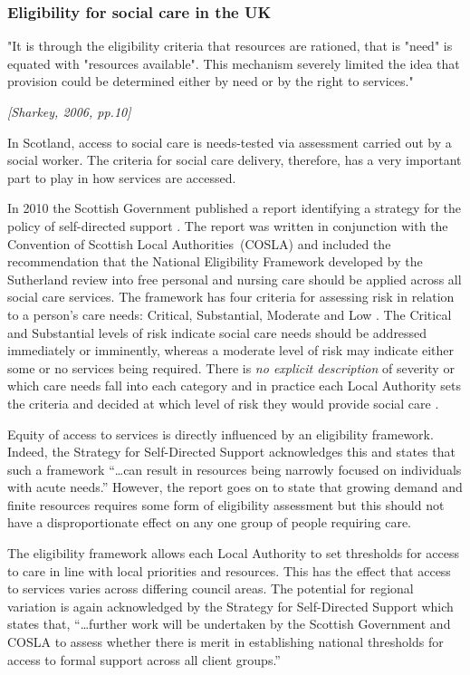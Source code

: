 \documentclass[12pt,]{report}
\begin{document}
\subsubsection{Eligibility for social care in the UK}\label{subsubsec:eligibility-uk}

\epigraph{"It is through the eligibility criteria that resources are rationed, that is "need" is equated with "resources available". This mechanism severely limited the idea that provision could be determined either by need or by the right to services."}{\textit{[Sharkey, 2006, pp.10]}}

In Scotland, access to social care is needs-tested via assessment
carried out by a social worker. The criteria for social care delivery,
therefore, has a very important part to play in how services are
accessed.

In 2010 the Scottish Government published a report identifying a
strategy for the policy of self-directed support \citep{RN171}. The
report was written in conjunction with the Convention of Scottish Local
Authorities~(COSLA) and included the recommendation that the National
Eligibility Framework developed by the Sutherland review into free
personal and nursing care \citeyearpar{RN172} should be applied across
all social care services. The framework has four criteria for assessing
risk in relation to a person's care needs: Critical, Substantial,
Moderate and Low \citep{RN184}. The Critical and Substantial levels of
risk indicate social care needs should be addressed immediately or
imminently, whereas a moderate level of risk may indicate either some or
no services being required. There is \emph{no explicit description} of
severity or which care needs fall into each category and in practice
each Local Authority sets the criteria and decided at which level of
risk they would provide social care \citep{RN170}.

Equity of access to services is directly influenced by an eligibility
framework. Indeed, the Strategy for Self-Directed Support
\citep[pp.20]{RN171} acknowledges this and states that such a framework
``\ldots{}can result in resources being narrowly focused on individuals
with acute needs.'' However, the report goes on to state that growing
demand and finite resources requires some form of eligibility assessment
but this should not have a disproportionate effect on any one group of
people requiring care.

The eligibility framework allows each Local Authority to set thresholds
for access to care in line with local priorities and resources. This has
the effect that access to services varies across differing council
areas. The potential for regional variation is again acknowledged by the
Strategy for Self-Directed Support \citep[pp.20]{RN171} which states
that, ``\ldots{}further work will be undertaken by the Scottish
Government and COSLA to assess whether there is merit in establishing
national thresholds for access to formal support across all client
groups.''
\end{document}
